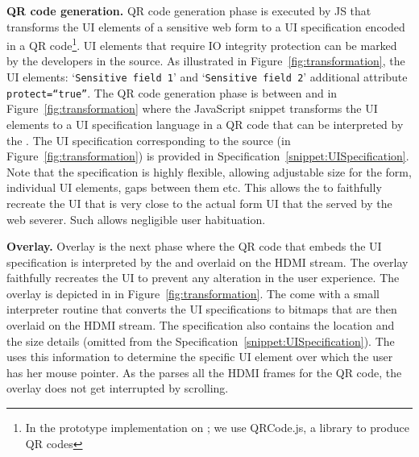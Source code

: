 % 


\begin{mylist}
\item \textbf{QR code generation.} QR code generation phase is executed by \name JS that transforms the UI elements of a sensitive web form to a UI specification encoded in a QR code\footnote{In the prototype implementation on \name; we use QRCode.js, a \js library to produce QR codes}. UI elements that require IO integrity protection can be marked by the developers in the \html source. As illustrated in Figure~\ref{fig:transformation}, the \html UI elements: `\texttt{Sensitive field 1}' and `\texttt{Sensitive field 2}' additional attribute \texttt{protect=``true''}. The QR code generation phase is between \one and \two in Figure~\ref{fig:transformation} where the \name JavaScript snippet transforms the UI elements to a UI specification language in a QR code that can be interpreted by the \device. The UI specification corresponding to the \html source (in Figure~\ref{fig:transformation}) is provided in Specification~\ref{snippet:UISpecification}. Note that the specification is highly flexible, allowing adjustable size for the form, individual UI elements, gaps between them etc. This allows the \device to faithfully recreate the UI that is very close to the actual form UI that the served by the web severer. Such allows negligible user habituation. 

\item \textbf{Overlay.} Overlay is the next phase where the QR code that embeds the UI specification is interpreted by the \device and overlaid on the HDMI stream. The overlay faithfully recreates the UI to prevent any alteration in the user experience. The \device overlay is depicted in \three in Figure~\ref{fig:transformation}. The \device come with a small interpreter routine that converts the UI specifications to bitmaps that are then overlaid on the HDMI stream. The specification also contains the location and the size details (omitted from the Specification~\ref{snippet:UISpecification}). The \device uses this information to determine the specific UI element over which the user has her mouse pointer. As the \device parses all the HDMI frames for the QR code, the overlay does not get interrupted by scrolling.
\end{mylist}

